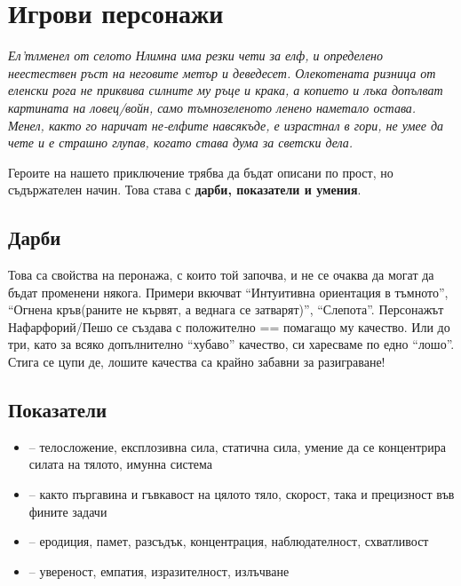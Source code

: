 \section{Игрови персонажи}
\emph{Ел'тлменел от селото Нлимна има резки чети за елф, и определено
неестествен ръст на неговите метър и деведесет. Олекотената ризница
от еленски рога не приквива силните му ръце и крака, а копието и лъка
допълват картината на ловец/войн, само тъмнозеленото ленено наметало
остава. Менел, както го наричат не-елфите навсякъде, е израстнал в гори,
не умее да чете и е страшно глупав, когато става дума за светски дела.}

Героите на нашето приключение трябва да бъдат описани по прост, но съдържателен начин. Това става с {\bf дарби, показатели и умения}.

\subsection{Дарби}
Това са свойства на перонажа, с които той започва, и не се очаква да могат да
бъдат променени някога. Примери вкючват “Интуитивна ориентация в тъмното”,
“Огнена кръв(раните не кървят, а веднага се затварят)”, “Слепота”. Персонажът
Нафарфорий/Пешо се създава с { положително} == помагащо му качество.
Или до { три}, като за всяко допълнително “хубаво” качество, си харесваме
по едно “лошо”. Стига се цупи де, лошите качества са крайно забавни за разиграване!

\subsection{Показатели}
\begin{itemize}
\item {} – телосложение, експлозивна сила, статична сила, умение да се концентрира силата на тялото, имунна система
\item {} – както пъргавина и гъвкавост на цялото тяло, скорост, така и прецизност във фините задачи
\item {} – еродиция, памет, разсъдък, концентрация, наблюдателност, схватливост
\item {} – увереност, емпатия, изразителност, излъчване
\end{itemize}


